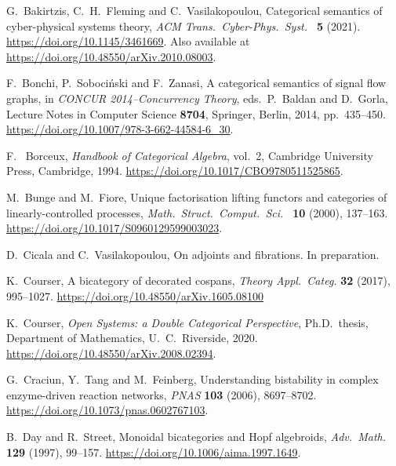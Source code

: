 \documentclass[a4paper,onecolumn, superscriptaddress,10pt, accepted=2022-03-25, issue=SS, volume=VV, shorttitle=papers/compositionality-VV-SS]{compositionalityarticle}
\begin{document}
\begin{thebibliography}{100}
 G.\ Bakirtzis, C.\ H.\ Fleming and C.\ Vasilakopoulou, Categorical semantics of cyber-physical systems theory, \textsl{ACM Trans.\ 
Cyber-Phys.\ Syst.\ } \textbf{5} (2021). \href{https://doi.org/10.1145/3461669}{https://doi.org/10.1145/3461669}.   Also available at \href{https://doi.org/10.48550/arXiv.2010.08003}{https://doi.org/10.48550/arXiv.2010.08003}.

 F.\ Bonchi, P.\ Soboci\'nski and F.\ Zanasi, A categorical semantics of signal flow graphs, in \textsl{CONCUR 2014--Concurrency Theory}, 
eds.\ P.\ Baldan and D.\ Gorla, Lecture Notes in Computer Science \textbf{8704}, Springer, Berlin, 2014, pp.\ 435--450. 
\href{https://doi.org/10.1007/978-3-662-44584-6\_30}{https://doi.org/10.1007/978-3-662-44584-6\_30}.  

 F. \ Borceux, \textsl{Handbook of Categorical Algebra}, vol.\ 2, 
Cambridge University Press, Cambridge, 1994. \href{https://doi.org/10.1017/CBO9780511525865}{https://doi.org/10.1017/CBO9780511525865}.

 M.\ Bunge and M.\ Fiore, Unique factorisation lifting functors and categories of linearly-controlled processes, \textsl{Math.\ 
Struct.\ Comput.\ Sci.\ } \textbf{10} (2000), 137--163. \hfill \break
\href{https://doi.org/10.1017/S0960129599003023}{https://doi.org/10.1017/S0960129599003023}.

\bibitem{CV} D.\ Cicala and C.\ Vasilakopoulou, On adjoints and fibrations. In preparation.

\bibitem{Courser} K.\ Courser, A bicategory of decorated cospans, \textsl{Theory Appl.\ Categ.} \textbf{32} (2017), 995--1027.  \href{https://doi.org/10.48550/arXiv.1605.08100}{https://doi.org/10.48550/arXiv.1605.08100}

\bibitem{CourserThesis} K.\ Courser, \textsl{Open Systems: a Double Categorical Perspective}, Ph.D.\ thesis, Department of Mathematics, U.\ C.\ Riverside, 2020.  
\href{https://doi.org/10.48550/arXiv.2008.02394}{https://doi.org/10.48550/arXiv.2008.02394}.

\bibitem{CTF} G.\ Craciun, Y.\ Tang and M.\ Feinberg, Understanding bistability in complex enzyme-driven reaction networks, \textsl{PNAS} \textbf{103} 
(2006), 8697--8702. \href{https://doi.org/10.1073/pnas.0602767103}{https://doi.org/10.1073/pnas.0602767103}. 

\bibitem{DS} B.\ Day and R.\ Street, Monoidal bicategories and Hopf algebroids, \textsl{Adv.\ Math.} \textbf{129} (1997), 99--157. 
\href{https://doi.org/10.1006/aima.1997.1649}{https://doi.org/10.1006/aima.1997.1649}.


\end{thebibliography}
\end{document}

